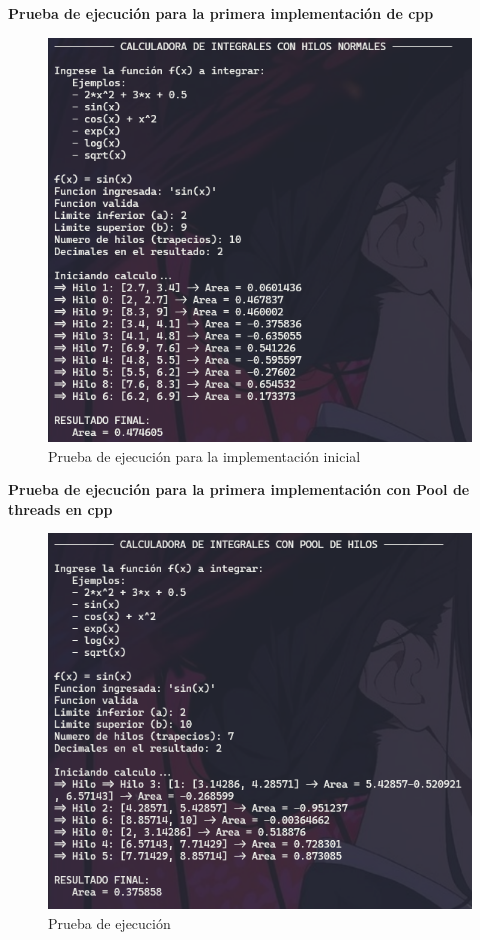 \textbf{Prueba de ejecución para la primera implementación de cpp}

\begin{figure}[H]
    \centering
    \includegraphics[width=0.8\linewidth]{img/cpp_prueba_hilo_1.png}
    \caption{Prueba de ejecución para la implementación inicial}
    \label{fig:placeholder}
\end{figure}

\textbf{Prueba de ejecución para la primera implementación con Pool de threads en cpp}

\begin{figure}[H]
    \centering
    \includegraphics[width=0.8\linewidth]{img/cpp_prueba_pool_1.png}
    \caption{Prueba de ejecución}
    \label{fig:placeholder}
\end{figure}


